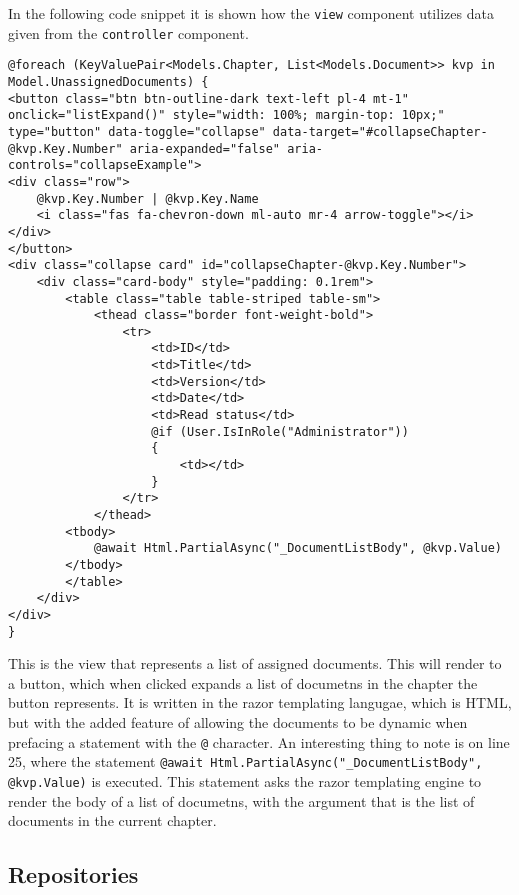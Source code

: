 In the following code snippet it is shown how the \texttt{view} component utilizes data given from the \texttt{controller} component.
\\
\begin{lstlisting}[caption={Document View: Index}, label={lst:docview}]
@foreach (KeyValuePair<Models.Chapter, List<Models.Document>> kvp in Model.UnassignedDocuments) {
<button class="btn btn-outline-dark text-left pl-4 mt-1" onclick="listExpand()" style="width: 100%; margin-top: 10px;" type="button" data-toggle="collapse" data-target="#collapseChapter-@kvp.Key.Number" aria-expanded="false" aria-controls="collapseExample">
<div class="row">
	@kvp.Key.Number | @kvp.Key.Name
	<i class="fas fa-chevron-down ml-auto mr-4 arrow-toggle"></i>
</div>
</button>
<div class="collapse card" id="collapseChapter-@kvp.Key.Number">
	<div class="card-body" style="padding: 0.1rem">
		<table class="table table-striped table-sm">
			<thead class="border font-weight-bold">
				<tr>
					<td>ID</td>
					<td>Title</td>
					<td>Version</td>
					<td>Date</td>
					<td>Read status</td>
					@if (User.IsInRole("Administrator"))
					{
						<td></td>
					}
				</tr>
			</thead>
		<tbody>
			@await Html.PartialAsync("_DocumentListBody", @kvp.Value)
		</tbody>
		</table>
	</div>
</div>
}

\end{lstlisting}

This is the view that represents a list of assigned documents. This will render to a button, which when clicked expands a list of documetns in the chapter the button represents.
It is written in the razor templating langugae, which is HTML, but with the added feature of allowing the documents to be dynamic when prefacing a statement with the \texttt{@} character.
An interesting thing to note is on line 25, where the statement \texttt{@await Html.PartialAsync("_DocumentListBody", @kvp.Value)} is executed.
This statement asks the razor templating engine to render the body of a list of documetns, with the argument that is the list of documents in the current chapter.

\subsection{Repositories}

